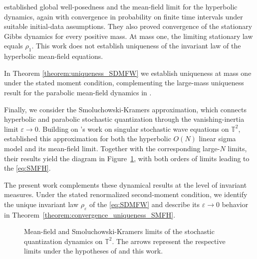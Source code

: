 \cite{liu2025} established global well-posedness and the mean-field limit for the hyperbolic dynamics, again with convergence in probability on finite time intervals under suitable initial-data assumptions. They also proved convergence of the stationary Gibbs dynamics for every positive mass. At mass one, the limiting stationary law equals $\rho_1$.
This work does not establish uniqueness of the invariant law of the hyperbolic mean-field equations. 

In Theorem \ref{theorem:uniqueness_SDMFW} we establish uniqueness at mass one under the stated moment condition, complementing the large-mass uniqueness result for the parabolic mean-field dynamics in \cite{Shen2022}.

Finally, we consider the Smoluchowski-Kramers approximation, which connects hyperbolic and parabolic stochastic quantization through the vanishing-inertia limit $\varepsilon\to0$. Building on \cite{Zine2025}'s work on singular stochastic wave equations on $\mathbb{T}^2$,  \cite{czernik2026} established this approximation for both the hyperbolic $O(N)$ linear sigma model and its mean-field limit. Together with the corresponding large-$N$ limits, their results yield the diagram in Figure~\ref{commutative_diagram}, with both orders of limits leading to the \eqref{eq:SMFH}.

The present work complements these dynamical results at the level of invariant measures. Under the stated renormalized second-moment condition, we identify the unique invariant law $\rho_\varepsilon$ of the \eqref{eq:SDMFW} and describe its $\varepsilon\to0$ behavior in Theorem~\ref{theorem:convergence_uniqueness_SMFH}.

\begin{figure}[htbp]
    \centering
    \caption{Mean-field and Smoluchowski-Kramers limits of the
    stochastic quantization dynamics on $\mathbb{T}^2$.
    The arrows represent the respective limits under the
    hypotheses of \cite{czernik2026} and this work.}\label{commutative_diagram}
\end{figure}

